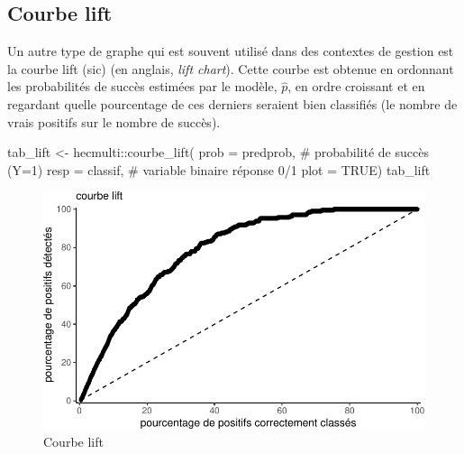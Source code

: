 \documentclass[
  11pt,
  letterpaper,
]{scrbook}
\newenvironment{Shaded}{\begin{snugshade}}{\end{snugshade}}
\newcommand{\AttributeTok}[1]{\textcolor[rgb]{0.40,0.45,0.13}{#1}}
\newcommand{\CommentTok}[1]{\textcolor[rgb]{0.37,0.37,0.37}{#1}}
\newcommand{\ConstantTok}[1]{\textcolor[rgb]{0.56,0.35,0.01}{#1}}
\newcommand{\FunctionTok}[1]{\textcolor[rgb]{0.28,0.35,0.67}{#1}}
\newcommand{\NormalTok}[1]{\textcolor[rgb]{0.00,0.23,0.31}{#1}}
\newcommand{\OtherTok}[1]{\textcolor[rgb]{0.00,0.23,0.31}{#1}}
\newcommand{\SpecialCharTok}[1]{\textcolor[rgb]{0.37,0.37,0.37}{#1}}
\theoremstyle{definition}
\theoremstyle{remark}
\begin{document}
\hypertarget{courbe-lift}{%
\subsection{Courbe lift}\label{courbe-lift}}

Un autre type de graphe qui est souvent utilisé dans des contextes de
gestion est la courbe lift (sic) (en anglais, \emph{lift chart}). Cette
courbe est obtenue en ordonnant les probabilités de succès estimées par
le modèle, \(\widehat{p}\), en ordre croissant et en regardant quelle
pourcentage de ces derniers seraient bien classifiés (le nombre de vrais
positifs sur le nombre de succès).

\begin{Shaded}
\begin{Highlighting}[]
\NormalTok{tab\_lift }\OtherTok{\textless{}{-}}\NormalTok{ hecmulti}\SpecialCharTok{::}\FunctionTok{courbe\_lift}\NormalTok{(}
  \AttributeTok{prob =}\NormalTok{ predprob, }\CommentTok{\# probabilité de succès (Y=1)}
  \AttributeTok{resp =}\NormalTok{ classif, }\CommentTok{\# variable binaire réponse 0/1}
  \AttributeTok{plot =} \ConstantTok{TRUE}\NormalTok{)}
\NormalTok{tab\_lift}
\end{Highlighting}
\end{Shaded}

\begin{figure}[ht!]

{\centering \includegraphics{./05-reglogistique_files/figure-pdf/fig-lift-1.pdf}

}

\caption{\label{fig-lift}Courbe lift}

\end{figure}
\end{document}
